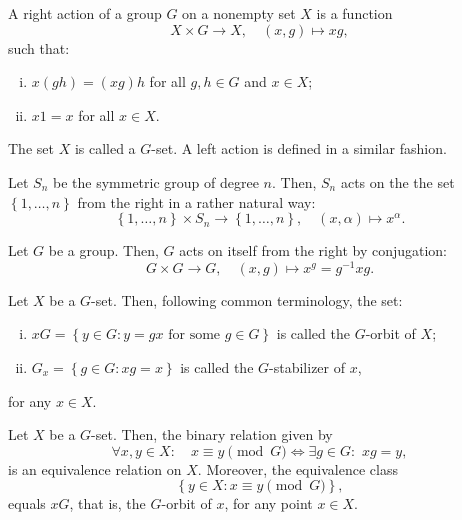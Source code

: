 \begin{definition}\label{def:group-action}
  A right action of a group \(G\) on a nonempty set \(X\) is a function
  \[
    X\times{G}\to{X},\quad(x,g)\mapsto{xg},
  \]
  such that:
  \begin{enumerate}[i.]
    \item
      \(x(gh)=(xg)h\) for all \(g,h\in{G}\) and \(x\in{X}\);
    \item
      \(x1=x\) for all \(x\in{X}\).
  \end{enumerate}
  The set \(X\) is called a \(G\)-set. A left action is defined in a similar
  fashion.
\end{definition}

\begin{example}\label{ex:action-of-symmetric-groups}
  Let \(S_{n}\) be the symmetric group of degree \(n\). Then, \(S_{n}\) acts on
  the the set \(\left\{1,\ldots,n\right\}\) from the right in a rather natural
  way:
  \[
    \left\{1,\ldots,n\right\}\times{S_{n}}\to\left\{1,\ldots,n\right\},
    \quad
    (x,\alpha)\mapsto{x^{\alpha}}.
  \]
\end{example}

\begin{example}\label{ex:conjugation}
  Let \(G\) be a group. Then, \(G\) acts on itself from the right by conjugation:
  \[
    G\times{G}\to{G},\quad(x,g)\mapsto{x^{g}=g^{-1}xg}.
  \]
\end{example}

\begin{definition}\label{def:orbits-and-stabilizers}
  Let \(X\) be a \(G\)-set. Then, following common terminology, the set:
  \begin{enumerate}[i.]
    \item
      \(xG=\left\{y\in{G}:y=gx\text{ for some }g\in{G}\right\}\) is called the
      \(G\)-orbit of \(X\);
    \item
      \(G_{x}=\left\{g\in{G}:xg=x\right\}\) is called the \(G\)-stabilizer of
      \(x\),
  \end{enumerate}
  for any \(x\in{X}\).
\end{definition}

\begin{proposition}\label{prop:orbit-decomposition-of-g-sets}
  Let \(X\) be a \(G\)-set. Then, the binary relation given by
  \begin{equation}\label{eq:g-equivalent-points}
    \forall{x,y\in{X}}:
    \quad
    x\equiv{y}\pmod{G}
    \iff
    \exists{g\in{G}}:
    \,\,
    xg=y,
  \end{equation}
  is an equivalence relation on \(X\). Moreover, the equivalence class
  \[
    \left\{y\in{X}:x\equiv{y}\pmod{G}\right\},
  \]
  equals \(xG\), that is, the \(G\)-orbit of \(x\), for any point \(x\in{X}\).
\end{proposition}

